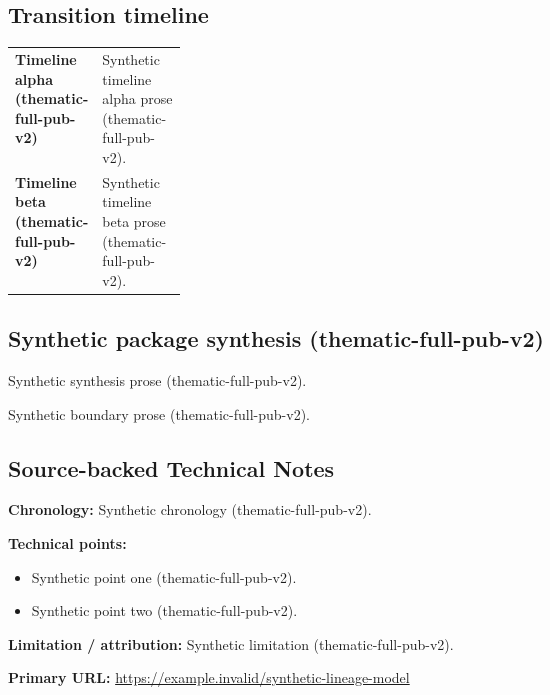 \documentclass[lualatex,a4paper,10pt]{jlreq}
\begin{document}
\medskip
\begin{wideflow}
\subsection*{Transition timeline}
\begin{tabularx}{\linewidth}{@{}>{\bfseries}p{0.20\linewidth}X@{}}
Timeline alpha (thematic-full-pub-v2) & Synthetic timeline alpha prose (thematic-full-pub-v2). \cite{sp001lnd001} \\
Timeline beta (thematic-full-pub-v2) & Synthetic timeline beta prose (thematic-full-pub-v2). \cite{sp001lnd001} \\
\end{tabularx}
\end{wideflow}
\medskip
\begin{multicols}{2}
\subsection*{Synthetic package synthesis (thematic-full-pub-v2)}
\noindent Synthetic synthesis prose (thematic-full-pub-v2). \cite{sp001lnd001}\par\medskip
\end{multicols}
\medskip
\begin{claimboundary}
\noindent Synthetic boundary prose (thematic-full-pub-v2). \cite{sp001lnd001}\par
\end{claimboundary}
\medskip
\subsection*{Source-backed Technical Notes}
\begin{technicalnote}
\noindent\textbf{Chronology:} Synthetic chronology (thematic-full-pub-v2). \cite{sp001lnd001}\par
\smallskip\noindent\textbf{Technical points:}\par
\begin{itemize}
\item Synthetic point one (thematic-full-pub-v2). \cite{sp001lnd001}
\item Synthetic point two (thematic-full-pub-v2). \cite{sp001lnd001}
\end{itemize}
\noindent\textbf{Limitation / attribution:} Synthetic limitation (thematic-full-pub-v2).\par
\smallskip\noindent\textbf{Primary URL:} \url{https://example.invalid/synthetic-lineage-model}\par
\end{technicalnote}
\smallskip
\Needspace{0.30\textheight}
\end{document}

